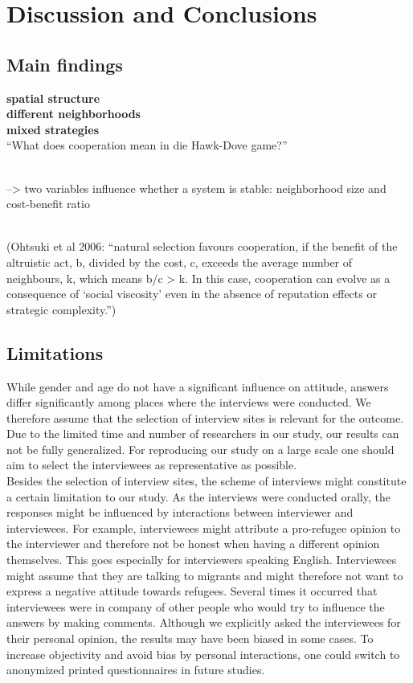 \section{Discussion and Conclusions}

\subsection{Main findings}

\textbf{spatial structure}\\
\textbf{different neighborhoods}\\
\textbf{mixed strategies}\\

``What does cooperation mean in die Hawk-Dove game?''

\\
--> two variables influence whether a system is stable: neighborhood size and cost-benefit ratio

\\
(Ohtsuki et al 2006:
 ``natural selection favours cooperation, if the
 benefit of the altruistic act, b, divided by the cost, c, exceeds the
 average number of neighbours, k, which means b/c > k. In this
 case, cooperation can evolve as a consequence of ‘social viscosity’
 even in the absence of reputation effects or strategic complexity.'')
 

\subsection{Limitations}
While gender and age do not have a significant influence on attitude, answers differ significantly among places where the interviews were conducted. We therefore assume that the selection of interview sites is relevant for the outcome. Due to the limited time and number of researchers in our study, our results can not be fully generalized. For reproducing our study on a large scale one should aim to select the interviewees as representative as possible.\\
Besides the selection of interview sites, the scheme of interviews might constitute a certain limitation to our study. As the interviews were conducted orally, the responses might be influenced by interactions between interviewer and interviewees. For example, interviewees might attribute a pro-refugee opinion to the interviewer and therefore not be honest when having a different opinion themselves. This goes especially for interviewers speaking English. Interviewees might assume that they are talking to migrants and might therefore not want to express a negative attitude towards refugees. Several times it occurred that interviewees were in company of other people who would try to influence the answers by making comments. Although we explicitly asked the interviewees for their personal opinion, the results may have been biased in some cases. To increase objectivity and avoid bias by personal interactions, one could switch to anonymized printed questionnaires in future studies.\\

